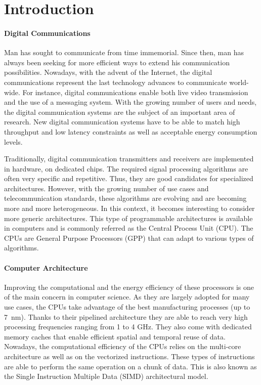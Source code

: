 
\graphicspath{{main/introduction/fig/}}

\chapter*{Introduction}

\subsubsection*{Digital Communications}

Man has sought to communicate from time immemorial. Since then, man has always
been seeking for more efficient ways to extend his communication possibilities.
Nowadays, with the advent of the Internet, the digital communications represent
the last technology advances to communicate world-wide. For instance, digital
communications enable both live video transmission and the use of a messaging
system. With the growing number of users and needs, the digital communication
systems are the subject of an important area of research. New digital
communication systems have to be able to match high throughput and low latency
constraints as well as acceptable energy consumption levels.

Traditionally, digital communication transmitters and receivers are implemented
in hardware, on dedicated chips. The required signal processing algorithms are
often very specific and repetitive. Thus, they are good candidates for
specialized architectures. However, with the growing number of use cases and
telecommunication standards, these algorithms are evolving and are becoming more
and more heterogeneous. In this context, it becomes interesting to consider more
generic architectures. This type of programmable architectures is available in
computers and is commonly referred as the Central Process Unit (CPU). The CPUs
are General Purpose Processors (GPP) that can adapt to various types of
algorithms.

\subsubsection*{Computer Architecture}

Improving the computational and the energy efficiency of these processors is one
of the main concern in computer science. As they are largely adopted for many
use cases, the CPUs take advantage of the best manufacturing processes (up to
7~nm). Thanks to their pipelined architecture they are able to reach very high
processing frequencies ranging from 1 to 4 GHz. They also come with dedicated
memory caches that enable efficient spatial and temporal reuse of data.
Nowadays, the computational efficiency of the CPUs relies on the multi-core
architecture as well as on the vectorized instructions. These types of
instructions are able to perform the same operation on a chunk of data. This is
also known as the Single Instruction Multiple Data (SIMD) architectural model.

